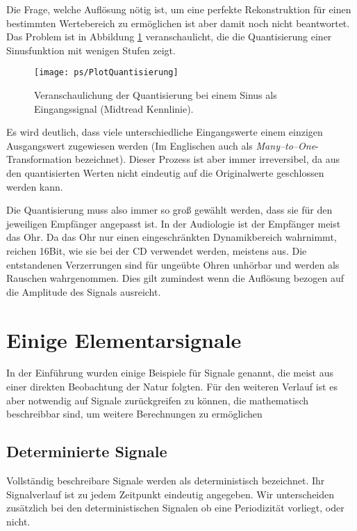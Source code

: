 Die Frage, welche Auflösung nötig ist, um eine perfekte Rekonstruktion für einen
bestimmten Wertebereich zu ermöglichen ist aber damit noch nicht beantwortet. Das
Problem ist in Abbildung \ref{pic:QuantisierungSinus}
veranschaulicht, die die Quantisierung einer Sinusfunktion mit wenigen Stufen zeigt.

\begin{figure}[H]
\begin{center}
\texttt{[image: ps/PlotQuantisierung]}
\caption{\label{pic:QuantisierungSinus} Veranschaulichung der Quantisierung
bei einem Sinus als Eingangssignal (Midtread Kennlinie).}
\end{center}
\end{figure}

Es wird deutlich, dass viele unterschiedliche Eingangswerte einem einzigen Ausgangswert
zugewiesen werden (Im Englischen auch als {\em Many--to--One}-Transformation bezeichnet).
Dieser Prozess ist aber immer irreversibel, da aus den quantisierten Werten nicht eindeutig auf die
Originalwerte geschlossen werden kann.


Die Quantisierung muss also immer so groß gewählt werden, dass sie für den jeweiligen Empfänger angepasst ist. In der Audiologie ist der Empfänger meist das Ohr. Da das Ohr nur einen eingeschränkten Dynamikbereich wahrnimmt, reichen 16Bit, wie sie bei der CD verwendet werden, meistens aus. Die entstandenen Verzerrungen sind für ungeübte Ohren unhörbar und werden als Rauschen wahrgenommen. Dies gilt zumindest wenn die Auflösung bezogen auf die Amplitude des Signals ausreicht.

\section{Einige Elementarsignale}
In der Einführung wurden einige Beispiele für Signale genannt, die meist aus einer direkten Beobachtung der Natur folgten. Für den weiteren Verlauf ist es aber notwendig auf Signale zurückgreifen zu können, die mathematisch beschreibbar sind, um weitere Berechnungen zu ermöglichen

\subsection{Determinierte Signale}
Vollständig beschreibare Signale werden als deterministisch bezeichnet. Ihr
Signalverlauf ist zu jedem Zeitpunkt eindeutig angegeben. Wir unterscheiden
zusätzlich bei den deterministischen Signalen ob eine Periodizität vorliegt, oder nicht.
